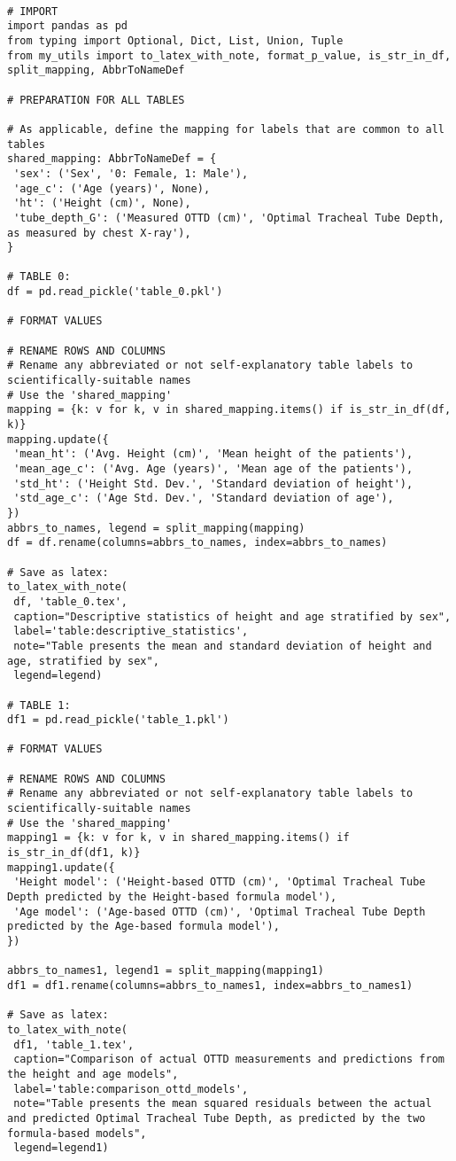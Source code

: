 \documentclass[11pt]{article}
\begin{document}
\begin{verbatim}

# IMPORT
import pandas as pd
from typing import Optional, Dict, List, Union, Tuple
from my_utils import to_latex_with_note, format_p_value, is_str_in_df, split_mapping, AbbrToNameDef

# PREPARATION FOR ALL TABLES

# As applicable, define the mapping for labels that are common to all tables
shared_mapping: AbbrToNameDef = {
 'sex': ('Sex', '0: Female, 1: Male'),
 'age_c': ('Age (years)', None),
 'ht': ('Height (cm)', None),
 'tube_depth_G': ('Measured OTTD (cm)', 'Optimal Tracheal Tube Depth, as measured by chest X-ray'),
}

# TABLE 0:
df = pd.read_pickle('table_0.pkl')

# FORMAT VALUES

# RENAME ROWS AND COLUMNS
# Rename any abbreviated or not self-explanatory table labels to scientifically-suitable names
# Use the 'shared_mapping' 
mapping = {k: v for k, v in shared_mapping.items() if is_str_in_df(df, k)} 
mapping.update({
 'mean_ht': ('Avg. Height (cm)', 'Mean height of the patients'),
 'mean_age_c': ('Avg. Age (years)', 'Mean age of the patients'),
 'std_ht': ('Height Std. Dev.', 'Standard deviation of height'),
 'std_age_c': ('Age Std. Dev.', 'Standard deviation of age'),
})
abbrs_to_names, legend = split_mapping(mapping)
df = df.rename(columns=abbrs_to_names, index=abbrs_to_names)

# Save as latex:
to_latex_with_note(
 df, 'table_0.tex',
 caption="Descriptive statistics of height and age stratified by sex", 
 label='table:descriptive_statistics',
 note="Table presents the mean and standard deviation of height and age, stratified by sex",
 legend=legend)

# TABLE 1:
df1 = pd.read_pickle('table_1.pkl')

# FORMAT VALUES

# RENAME ROWS AND COLUMNS
# Rename any abbreviated or not self-explanatory table labels to scientifically-suitable names
# Use the 'shared_mapping' 
mapping1 = {k: v for k, v in shared_mapping.items() if is_str_in_df(df1, k)} 
mapping1.update({
 'Height model': ('Height-based OTTD (cm)', 'Optimal Tracheal Tube Depth predicted by the Height-based formula model'),
 'Age model': ('Age-based OTTD (cm)', 'Optimal Tracheal Tube Depth predicted by the Age-based formula model'),
})

abbrs_to_names1, legend1 = split_mapping(mapping1)
df1 = df1.rename(columns=abbrs_to_names1, index=abbrs_to_names1)

# Save as latex:
to_latex_with_note(
 df1, 'table_1.tex',
 caption="Comparison of actual OTTD measurements and predictions from the height and age models", 
 label='table:comparison_ottd_models',
 note="Table presents the mean squared residuals between the actual and predicted Optimal Tracheal Tube Depth, as predicted by the two formula-based models",
 legend=legend1)
 
\end{verbatim}
\end{document}
